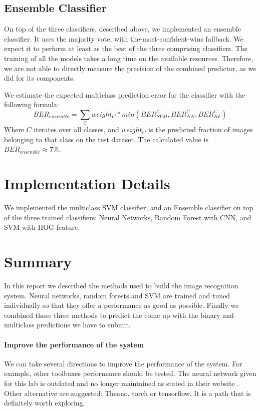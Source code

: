 \documentclass{article} %
\begin{document}
\subsection{Ensemble Classifier}

On top of the three classifiers, described above, we implemented an ensemble classifier. It uses the majority vote, with the-most-confident-wins fallback. We expect it to perform at least as the best of the three comprising classifiers. The training of all the models takes a long time on the available resources. Therefore, we are not able to directly measure the precision of the combined predictor, as we did for its components.

We estimate the expected multiclass prediction error for the classifier with the following formula:
\[
BER_{ensemble} = \sum_C weight_C*min(BER_{SVM}^C, BER_{NN}^C, BER_{RF}^C)
\]
Where $C$ iterates over all classes, and $weight_C$ is the predicted fraction of images belonging to that class on the test dataset. The calculated value is $BER_{ensemble} \approx 7\%$.

\section{Implementation Details}

We implemented the multiclass SVM classifier, and an Ensemble classifier on top of the three trained classifiers: Neural Networks, Random Forest with CNN, and SVM with HOG feature.


\section{Summary}

In this report we described the methods used to build the image recognition system. 
Neural networks, random forests and SVM are trained and tuned individually so that they offer a performance as good as possible.
Finally we combined those three methods to predict the come up with the binary and multiclass predictions we have to submit. 

\paragraph{Improve the performance of the system}
We can take several directions to improve the performance of the system.
For example, other toolboxes performance should be tested. The neural network given for this lab is outdated and no longer maintained as stated in their website \cite{deeplearningtoolbox}. Other alternative are suggested: Theano, torch or tensorflow. It is a path that is definitely worth exploring.
\end{document}
